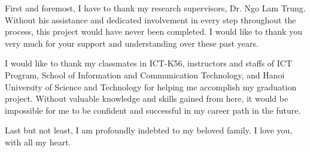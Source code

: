 \begin{acknowledgement}
First and foremost, I have to thank my research supervisors, Dr. Ngo Lam Trung. Without his assistance and dedicated involvement in every step throughout the process, this project would have never been completed. I would like to thank you very much for your support and understanding over these past years.

I would like to thank my classmates in ICT-K56, instructors and staffs of ICT Program, School of Information and Communication Technology, and Hanoi University of Science and Technology for helping me accomplish my graduation project. Without valuable knowledge and skills gained from here, it would be impossible for me to be confident and successful in my career path in the future.

Last but not least, I am profoundly indebted to my beloved family. I love you, with all my heart.

\end{acknowledgement}
